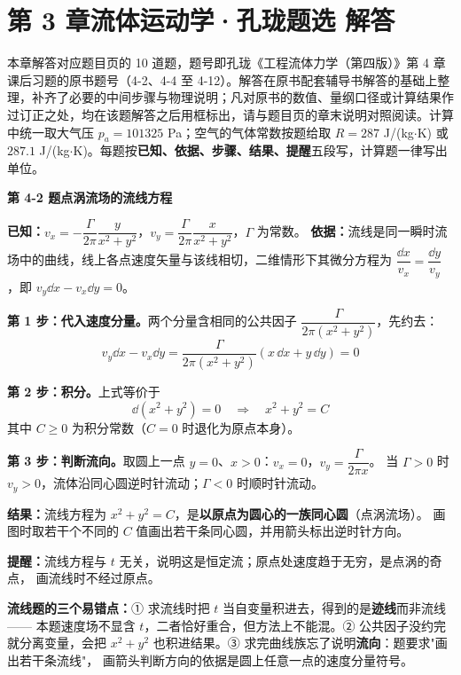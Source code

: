 \chapter*{第 3 章\quad 流体运动学·孔珑题选 解答}

\begin{tishi}
本章解答对应题目页的 10 道题，题号即孔珑《工程流体力学（第四版）》第 4 章课后习题的原书题号（4-2、4-4 至 4-12）。解答在原书配套辅导书解答的基础上整理，补齐了必要的中间步骤与物理说明；凡对原书的数值、量纲口径或计算结果作过订正之处，均在该题解答之后用框标出，请与题目页的章末说明对照阅读。计算中统一取大气压 $p_a=101325$ Pa；空气的气体常数按题给取 $R=287$ J/(kg$\cdot$K) 或 $287.1$ J/(kg$\cdot$K)。每题按\textbf{已知、依据、步骤、结果、提醒}五段写，计算题一律写出单位。
\end{tishi}

\noindent\textbf{第 4-2 题\quad 点涡流场的流线方程}

\begin{jie}
\textbf{已知：}$v_x=-\dfrac{\Gamma}{2\pi}\dfrac{y}{x^2+y^2}$，$v_y=\dfrac{\Gamma}{2\pi}\dfrac{x}{x^2+y^2}$，$\Gamma$ 为常数。
\textbf{依据：}流线是同一瞬时流场中的曲线，线上各点速度矢量与该线相切，二维情形下其微分方程为
$\dfrac{\dd x}{v_x}=\dfrac{\dd y}{v_y}$，即 $v_y\dd x-v_x\dd y=0$。

\textbf{第 1 步：代入速度分量。}两个分量含相同的公共因子 $\dfrac{\Gamma}{2\pi(x^2+y^2)}$，先约去：
\[ v_y\dd x-v_x\dd y=\frac{\Gamma}{2\pi(x^2+y^2)}\left(x\,\dd x+y\,\dd y\right)=0 \]

\textbf{第 2 步：积分。}上式等价于
\[ \dd\left(x^2+y^2\right)=0\quad\Longrightarrow\quad x^2+y^2=C \]
其中 $C\ge0$ 为积分常数（$C=0$ 时退化为原点本身）。

\textbf{第 3 步：判断流向。}取圆上一点 $y=0$、$x>0$：$v_x=0$，$v_y=\dfrac{\Gamma}{2\pi x}$。
当 $\Gamma>0$ 时 $v_y>0$，流体沿同心圆逆时针流动；$\Gamma<0$ 时顺时针流动。

\textbf{结果：}流线方程为 $x^2+y^2=C$，是\textbf{以原点为圆心的一族同心圆}（点涡流场）。
画图时取若干个不同的 $C$ 值画出若干条同心圆，并用箭头标出逆时针方向。

\textbf{提醒：}流线方程与 $t$ 无关，说明这是恒定流；原点处速度趋于无穷，是点涡的奇点，
画流线时不经过原点。
\end{jie}

\begin{yicuo}
\textbf{流线题的三个易错点：}① 求流线时把 $t$ 当自变量积进去，得到的是\textbf{迹线}而非流线——
本题速度场不显含 $t$，二者恰好重合，但方法上不能混。② 公共因子没约完就分离变量，会把
$x^2+y^2$ 也积进结果。③ 求完曲线族忘了说明\textbf{流向}：题要求"画出若干条流线"，
画箭头判断方向的依据是圆上任意一点的速度分量符号。
\end{yicuo}

